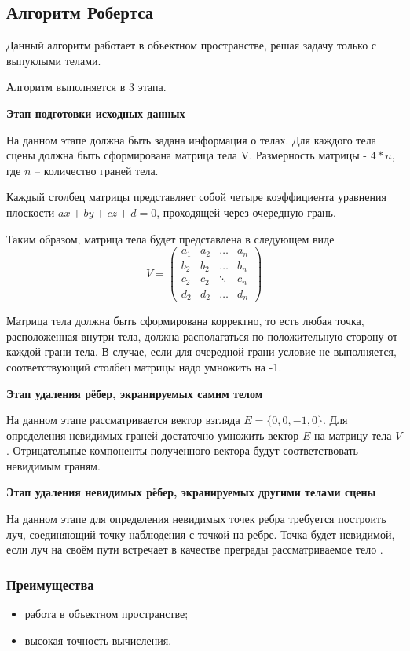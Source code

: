 \subsection{Алгоритм Робертса}
Данный алгоритм работает в объектном пространстве, решая задачу только с выпуклыми телами.

Алгоритм выполняется в 3 этапа.

\textbf{Этап подготовки исходных данных}

На данном этапе должна быть задана информация о телах. Для каждого тела сцены должна быть сформирована матрица тела V. Размерность матрицы - $4*n$, где $n$ – количество граней тела.

Каждый столбец матрицы представляет собой четыре коэффициента уравнения плоскости  $ax+by+cz+d=0$, проходящей через очередную грань.

Таким образом, матрица тела будет представлена в следующем виде
\begin{equation}
	\label{eq:matr}
	V = \begin{pmatrix}
		a_{1} & a_{2} & \ldots & a_{n}\\
		b_{2} & b_{2} & \ldots & b_{n}\\
		c_{2} & c_{2} & \ddots & c_{n}\\
		d_{2} & d_{2} & \ldots & d_{n}
	\end{pmatrix}
\end{equation}

Матрица тела должна быть сформирована корректно, то есть любая точка, расположенная внутри тела, должна располагаться по положительную сторону от каждой грани тела. В случае, если для очередной грани условие не выполняется, соответствующий столбец матрицы надо умножить на -1. 

\textbf{Этап удаления рёбер, экранируемых самим телом}

На данном этапе рассматривается вектор взгляда $E=\{0, 0,-1, 0\}$.
Для определения невидимых граней достаточно умножить вектор $E$ на матрицу тела $V$. Отрицательные компоненты полученного вектора будут соответствовать невидимым граням.

\textbf{Этап удаления невидимых рёбер, экранируемых другими телами сцены}

На данном этапе для определения невидимых точек ребра требуется построить луч, соединяющий точку наблюдения с точкой на ребре. Точка будет невидимой, если луч на своём пути встречает в качестве преграды рассматриваемое тело \cite{roberts}.

\subsubsection*{Преимущества}
\begin{itemize}
	\item работа в объектном пространстве;
	\item высокая точность вычисления.
\end{itemize}

